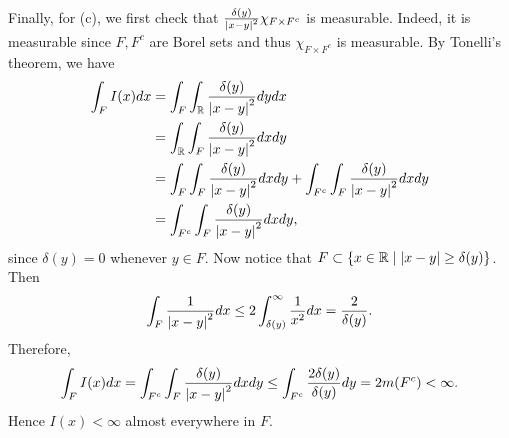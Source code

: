 \begin{pf}
    Finally, for (c), we first check that $\frac{\delta(y)}{\left\lvert {x-y} \right\rvert^2}\chi_{F\times F^c}$ 
    is measurable. Indeed, it is measurable since $F, F^c$ are Borel sets and 
    thus $\chi_{F\times F^c}$ is measurable. By Tonelli's theorem, we have
    \begin{equation*}
        \begin{split}
            \int_{F} I(x)dx &= \int_{F} \int_{\mathbb{R}} \frac{\delta(y)}{\left\lvert {x-y} \right\rvert^2}dydx \\
            &= \int_{\mathbb{R}} \int_{F} \frac{\delta(y)}{\left\lvert {x-y} \right\rvert^2}dxdy \\
            &= \int_{F} \int_{F} \frac{\delta(y)}{\left\lvert {x-y} \right\rvert^2}dxdy + \int_{F^c} \int_{F} \frac{\delta(y)}{\left\lvert {x-y} \right\rvert^2}dxdy \\ 
            &= \int_{F^c} \int_{F} \frac{\delta(y)}{\left\lvert {x-y} \right\rvert^2}dxdy,
        \end{split}
    \end{equation*}
    since $\delta(y)=0$ whenever $y\in F$. Now notice that $F\subset \left\{ x\in\mathbb{R} \;\middle\vert\; \left\lvert {x-y} \right\rvert\geq \delta(y) \right\}$. 
    Then 
    \begin{equation*}
        \int_{F} \frac{1}{\left\lvert {x-y} \right\rvert^2}dx \leq 2\int_{\delta(y)}^{\infty} \frac{1}{x^2}dx = \frac{2}{\delta(y)}.
    \end{equation*}
    Therefore, 
    \begin{equation*}
        \int_{F} I(x)dx = \int_{F^c} \int_{F} \frac{\delta(y)}{\left\lvert {x-y} \right\rvert^2}dxdy 
        \leq \int_{F^c} \frac{2\delta(y)}{\delta(y)}dy 
        = 2m(F^c) < \infty.
    \end{equation*}
    Hence $I(x)<\infty$ almost everywhere in $F$.
\end{pf} 


